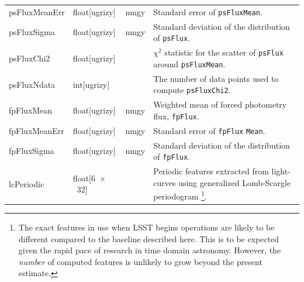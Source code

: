 \documentclass[12pt]{article}
\newcommand\x         {\hbox{$\times$}}
\newcommand{\B}[1]{{\color{blue} #1}}
\begin{document}
\begin{center}
\begin{longtable}{p{3cm}p{2cm}p{2cm}p{5cm}}
psFluxMeanErr & float[ugrizy] & nmgy & Standard error of \texttt{psFluxMean}.  \\

psFluxSigma & float[ugrizy] & nmgy & Standard deviation of the distribution of \texttt{psFlux}. \\

psFluxChi2 & float[ugrizy] & ~ & $\chi^2$ statistic for the scatter of \texttt{psFlux} around \texttt{psFluxMean}. \\

psFluxNdata & int[ugrizy] & ~ & The number of data points used to compute \texttt{psFluxChi2}. \\

fpFluxMean & float[ugrizy] & nmgy & Weighted mean of forced photometry flux, \texttt{fpFlux}.\\

fpFluxMeanErr & float[ugrizy] & nmgy & Standard error of \texttt{fpFlux}\B{\texttt{Mean}}. \\

fpFluxSigma & float[ugrizy] & nmgy & Standard deviation of the distribution of \texttt{fpFlux}. \\





lcPeriodic & float[6~\x~32] & ~ & Periodic features extracted from light-curves using generalized Lomb-Scargle periodogram \citep[Table~4,][]{2011ApJ...733...10R}\footnote{The exact features in use when LSST begins operations are likely to be different compared to the baseline described here. This is to be expected given the rapid pace of research in time domain astronomy. However, the \emph{number} of computed features is unlikely to grow beyond the present estimate.}. \\


\end{longtable}
\end{center}
\end{document}
